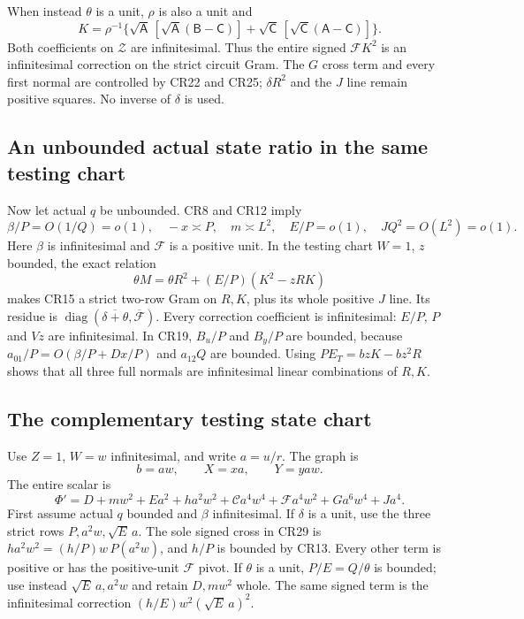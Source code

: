 When instead $\theta$ is a unit, $\rho$ is also a unit and
\[
 K=\rho^{-1}\{\sqrt{\mathsf A}\,
       [\sqrt{\mathsf A}(\mathsf B-\mathsf C)]
       +\sqrt{\mathsf C}\,
       [\sqrt{\mathsf C}(\mathsf A-\mathsf C)]\}.
 \tag{CR25}
\]
Both coefficients on $\mathcal Z$ are infinitesimal. Thus the
entire signed $\mathcal F K^2$ is an infinitesimal correction on
the strict circuit Gram. The $G$ cross term and every first normal
are controlled by CR22 and CR25; $\delta R^2$ and the $J$ line
remain positive squares. No inverse of $\delta$ is used.

\subsection{An unbounded actual state ratio in the same testing chart}

Now let actual $q$ be unbounded. CR8 and CR12 imply
\[
 \beta/P=O(1/Q)=o(1),\quad -x\asymp P,\quad
 m\asymp L^2,\quad E/P=o(1),\quad JQ^2=O(L^2)=o(1).
 \tag{CR26}
\]
Here $\beta$ is infinitesimal and $\mathcal F$ is a positive
unit. In the testing chart $W=1$, $z$ bounded, the exact relation
\[
 \theta M=\theta R^2+(E/P)(K^2-zRK)
 \tag{CR27}
\]
makes CR15 a strict two-row Gram on $R,K$, plus its whole positive
$J$ line. Its residue is
$\operatorname{diag}(\overline{\delta+\theta},\overline{\mathcal F})$.
Every correction coefficient is infinitesimal: $E/P$, $P$ and
$Vz$ are infinitesimal. In CR19, $B_u/P$ and $B_y/P$ are bounded,
because $a_{01}/P=O(\beta/P+Dx/P)$ and $a_{12}Q$ are bounded.
Using $P E_T=bzK-bz^2R$ shows that all three full normals are
infinitesimal linear combinations of $R,K$.

\subsection{The complementary testing state chart}

Use $Z=1$, $W=w$ infinitesimal, and write $a=u/r$. The graph is
\[
 b=aw,\qquad X=xa,\qquad Y=yaw.
 \tag{CR28}
\]
The entire scalar is
\[
 \Phi'=D+mw^2+Ea^2+ha^2w^2+\mathcal C a^4w^4
       +\mathcal F a^4w^2+Ga^6w^4+Ja^4.
 \tag{CR29}
\]
First assume actual $q$ bounded and $\beta$ infinitesimal. If
$\delta$ is a unit, use the three strict rows
$P,a^2w,\sqrt E\,a$. The sole signed cross in CR29 is
$h a^2w^2=(h/P)w\,P(a^2w)$, and $h/P$ is bounded by CR13.
Every other term is positive or has the positive-unit $\mathcal F$
pivot. If $\theta$ is a unit, $P/E=Q/\theta$ is bounded;
use instead $\sqrt E\,a,a^2w$ and retain $D,mw^2$ whole.
The same signed term is the infinitesimal correction
$(h/E)w^2(\sqrt E\,a)^2$.


